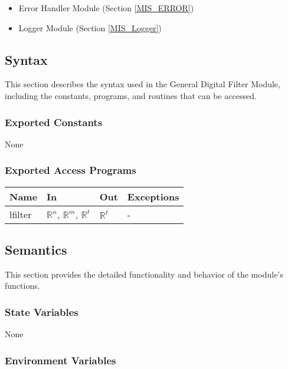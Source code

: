 \documentclass[12pt, titlepage]{article}
\begin{document}
\begin{itemize}
\item Error Handler Module (Section \ref{MIS_ERROR})
\item Logger Module (Section \ref{MIS_Logger})
\end{itemize}

\subsection{Syntax}

This section describes the syntax used in the General Digital Filter Module,
including the constants, programs, and routines that can be accessed.

\subsubsection{Exported Constants}

None

\subsubsection{Exported Access Programs}

\begin{center}
\begin{tabular}{p{2cm} p{4cm} p{4cm} p{2cm}}
\hline
\textbf{Name} & \textbf{In} & \textbf{Out} & \textbf{Exceptions} \\
\hline
lfilter & $\mathbb{R}^n$, $\mathbb{R}^m$, $\mathbb{R}^t$ & $\mathbb{R}^t$ & - \\
\hline
\end{tabular}
\end{center}

\subsection{Semantics}

This section provides the detailed functionality and behavior of the module’s
functions.

\subsubsection{State Variables}

None

\subsubsection{Environment Variables}
\end{document}

